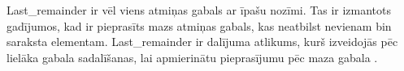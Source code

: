 Last\_remainder ir vēl viens atmiņas gabals ar īpašu nozīmi.
Tas ir izmantots gadījumos, kad ir pieprasīts mazs atmiņas gabals, kas neatbilst nevienam bin saraksta elementam. 
Last\_remainder ir dalījuma atlikums, kurš izveidojās pēc lielāka gabala sadalīšanas, lai apmierinātu pieprasījumu pēc maza gabala  \cite {MALLOC}.




